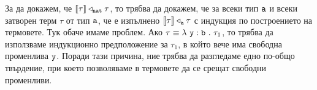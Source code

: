 
За да докажем, че $\llbracket{\tau}\rrbracket \triangleleft_{\texttt{nat}} \tau$, то трябва да докажем, че за всеки тип $\texttt{a}$ и всеки затворен терм $\tau$ от тип $\texttt{a}$, че е изпълнено
$\llbracket{\tau}\rrbracket \triangleleft_{\texttt{a}} \tau$ с индукция по построението на термовете.
Тук обаче имаме проблем. Ако $\tau \equiv \lambda~\texttt{y}:\texttt{b}~.~{\tau_1}$, то трябва да използваме индукционно предположение за $\tau_1$,
в който вече има свободна променлива $\texttt{y}$. Поради тази причина, ние трябва да разгледаме едно по-общо твърдение, при което позволяваме в термовете да се срещат свободни променливи.

